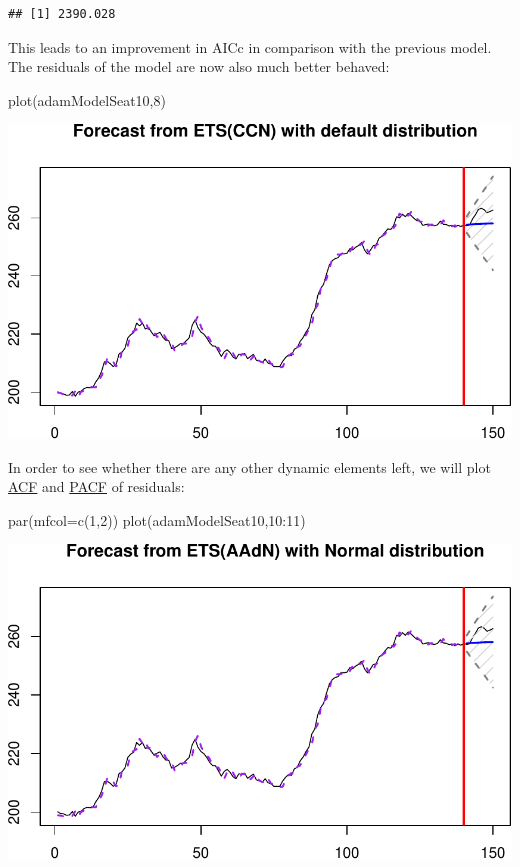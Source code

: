 \documentclass[
]{book}
\newenvironment{Shaded}{\begin{snugshade}}{\end{snugshade}}
\newcommand{\AttributeTok}[1]{\textcolor[rgb]{0.77,0.63,0.00}{#1}}
\newcommand{\DecValTok}[1]{\textcolor[rgb]{0.00,0.00,0.81}{#1}}
\newcommand{\FunctionTok}[1]{\textcolor[rgb]{0.00,0.00,0.00}{#1}}
\newcommand{\NormalTok}[1]{#1}
\newcommand{\SpecialCharTok}[1]{\textcolor[rgb]{0.00,0.00,0.00}{#1}}
\theoremstyle{definition}
\theoremstyle{definition}
\theoremstyle{definition}
\theoremstyle{definition}
\theoremstyle{remark}
\begin{document}
\begin{verbatim}
## [1] 2390.028
\end{verbatim}

This leads to an improvement in AICc in comparison with the previous model. The residuals of the model are now also much better behaved:

\begin{Shaded}
\begin{Highlighting}[]
\FunctionTok{plot}\NormalTok{(adamModelSeat10,}\DecValTok{8}\NormalTok{)}
\end{Highlighting}
\end{Shaded}

\includegraphics{adam_files/figure-latex/unnamed-chunk-154-1.pdf}

In order to see whether there are any other dynamic elements left, we will plot \protect\hyperlink{ACF}{ACF} and \protect\hyperlink{PACF}{PACF} of residuals:

\begin{Shaded}
\begin{Highlighting}[]
\FunctionTok{par}\NormalTok{(}\AttributeTok{mfcol=}\FunctionTok{c}\NormalTok{(}\DecValTok{1}\NormalTok{,}\DecValTok{2}\NormalTok{))}
\FunctionTok{plot}\NormalTok{(adamModelSeat10,}\DecValTok{10}\SpecialCharTok{:}\DecValTok{11}\NormalTok{)}
\end{Highlighting}
\end{Shaded}

\includegraphics{adam_files/figure-latex/unnamed-chunk-155-1.pdf}
\end{document}
